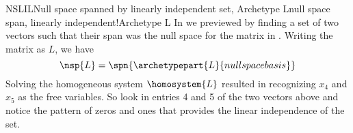 %
\begin{example}{NSLIL}{Null space spanned by linearly independent set,  Archetype L}{null space span, linearly independent!Archetype L}
In  we previewed  by finding a set of two vectors such that their span was the null space for the matrix in .  Writing the matrix as $L$, we have
%
\begin{equation*}
\nsp{L}=
\spn{\archetypepart{L}{nullspacebasis}}
\end{equation*}
%
Solving the homogeneous system $\homosystem{L}$ resulted in recognizing $x_4$ and $x_5$ as the free variables.  So look in entries 4 and 5 of the two vectors above and notice the pattern of zeros and ones that provides the linear independence of the set.
%
\end{example}
%
%

